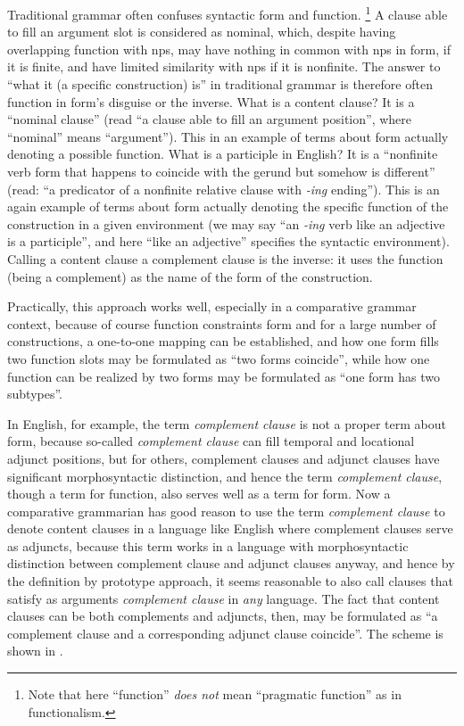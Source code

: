 \documentclass{article}
\newcommand*{\term}[1]{\emph{#1}}
\newcommand*{\corpus}[1]{\emph{#1}}
\begin{document}
Traditional grammar often confuses syntactic form and function.%
\footnote{Note that here ``function'' \emph{does not} mean ``pragmatic function'' as in functionalism.}
A clause able to fill an argument slot is considered as nominal,
which, despite having overlapping function with \ac{np}s,
may have nothing in common with \ac{np}s in form, if it is finite,
and have limited similarity with \ac{np}s if it is nonfinite.
The answer to ``what it (a specific construction) is'' in traditional grammar 
is therefore often function in form's disguise or the inverse.
What is a content clause? 
It is a ``nominal clause'' (read ``a clause able to fill an argument position'', 
where ``nominal'' means ``argument'').
This in an example of terms about form actually denoting a possible function. 
What is a participle in English?
It is a ``nonfinite verb form that happens to coincide with the gerund
but somehow is different'' 
(read: ``a predicator of a nonfinite relative clause with \corpus{-ing} ending'').
This is an again example of terms about form 
actually denoting the specific function of the construction in a given environment 
(we may say ``an \corpus{-ing} verb like an adjective is a participle'',
and here ``like an adjective'' specifies the syntactic environment).
Calling a content clause a complement clause is the inverse:
it uses the function (being a complement) as the name of the form of the construction.

Practically, this approach works well, especially in a comparative grammar context,
because of course function constraints form and for a large number of constructions,
a one-to-one mapping can be established,
and how one form fills two function slots may be formulated as ``two forms coincide'',
while how one function can be realized by two forms may be formulated as ``one form has two subtypes''.

In English, for example, the term \term{complement clause} is not a proper term about form,
because so-called \term{complement clause} can fill temporal and locational adjunct positions,
but for others, complement clauses and adjunct clauses have significant morphosyntactic distinction,
and hence the term \term{complement clause}, though a term for function,
also serves well as a term for form.
Now a comparative grammarian has good reason to use the term \term{complement clause}
to denote content clauses
in a language like English where complement clauses serve as adjuncts,
because this term works in a language 
with morphosyntactic distinction between complement clause and adjunct clauses anyway,
and hence by the definition by prototype approach,
it seems reasonable to also call clauses that satisfy as arguments
\term{complement clause} in \emph{any} language.
The fact that content clauses can be both complements and adjuncts, then,
may be formulated as ``a complement clause and a corresponding adjunct clause coincide''.
The scheme is shown in .
\end{document}
